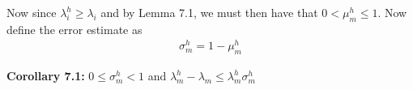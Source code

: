 \documentclass[../../main.tex]{subfiles}
\begin{document}
Now since $\lambda_{i}^{h} \geq \lambda_{i}$ and by Lemma 7.1, we must then have that $0 < \mu_{m}^{h} \leq 1$. Now define the error estimate as
\begin{eqnarray*}
\sigma_{m}^{h} = 1 - \mu_{m}^{h}
\end{eqnarray*}


\textbf{Corollary 7.1:} $0 \leq \sigma_{m}^{h} < 1$ and $\lambda_{m}^{h} - \lambda_{m} \leq \lambda_{m}^{h}\sigma_{m}^{h}$\\

\begin{comment}
\textbf{Proof:}
\begin{eqnarray*}
\lambda_{m}^{h} & \leq & \frac{\lambda_{m}}{\mu_{m}^{h}} \ \ \textrm { (by Lemma 7.1)} \\
\lambda_{m}^{h}\mu_{m}^{h}& \leq & \lambda_{m} \\
-\lambda_{m}& \leq & -\lambda_{m}^{h}\mu_{m}^{h} \\
\lambda_{m}^{h} -\lambda_{m}& \leq & \lambda_{m}^{h} -\lambda_{m}^{h}\mu_{m}^{h}\\
\lambda_{m}^{h} -\lambda_{m}& \leq & \lambda_{m}^{h}\sigma_{m}^{h}
\end{eqnarray*}\qed


So from this Corollary 7.1, we see that to prove that our approximate eigenvalues converge to the exact eigenvalues. The only thing then left to prove is  that $\sigma_{m}^{h} \rightarrow 0$ as $h \rightarrow 0$.\\
\\


\textbf{Proposition 7.1} $\sigma_{m}^{h} = \max\left\{ 2( u,u-Pu )-||u-Pu||^{2} \ | \ u \in B_{m} \right \}$\\


\textbf{Proof:}  Let $u \in B_{m}$. Then
\begin{eqnarray*}
||u - Pu||^{2} &=& ( u - Pu, u - Pu ) \\
				&=& ( u, u ) - 2 ( u, Pu ) + ( Pu, Pu ) \\
				&=& 2( u, u ) - 2 ( u, Pu ) + ( Pu, Pu ) - ( u, u )\\
				&=& 2( u, u - Pu ) + ( Pu, Pu ) - ( u, u )\\
( u, u ) - ( Pu, Pu )  & = & 2( u, u - Pu ) - ||u - Pu||^{2}	
\end{eqnarray*}
Now since $u \in B_{m}$, $<u,u> = 1$. So we have
\begin{eqnarray*}
1 - ||Pu||^{2}  & = & 2( u, u - Pu ) - ||u - Pu||^{2}	
\end{eqnarray*}
Now the right hand side, $1 - ||Pu||^{2} \leq 1 - \mu_{m}^{h} = \sigma_{m}^{h}$ for all $u \in B_{m}$. So then we must have that
\begin{eqnarray*}
\sigma_{m}^{h} = \max\left\{ 2( u,u-Pu )-||u-Pu||^{2} \ | \ u \in B_{m} \right \}
\end{eqnarray*}\qed
\end{comment}
\end{document}
